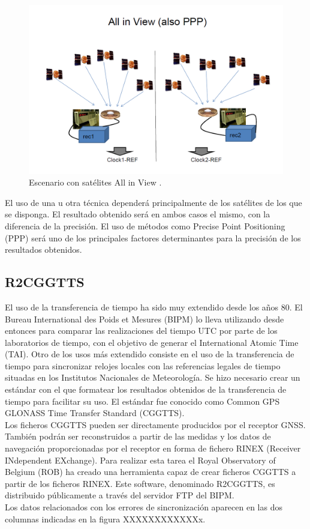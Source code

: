 \begin{figure}
	\centering
	\includegraphics[width=1\textwidth]{imagenes/allinview.PNG}
	\caption{\label{fig1}Escenario con satélites All in View \cite{timetransfer}.}
\end{figure}

El uso de una u otra técnica dependerá principalmente de los satélites de los que se disponga. El resultado obtenido será en ambos casos el mismo, con la diferencia de la precisión. El uso de métodos como Precise Point Positioning (PPP) será uno de los principales factores determinantes para la precisión de los resultados obtenidos.

\subsection{R2CGGTTS}
El uso de la transferencia de tiempo ha sido muy extendido desde los años 80. El Bureau International des Poids et Mesures (BIPM) lo lleva utilizando desde entonces para comparar las realizaciones del tiempo UTC por parte de los laboratorios de tiempo, con el objetivo de generar el International Atomic Time (TAI). Otro de los usos más extendido consiste en el uso de la transferencia de tiempo para sincronizar relojes locales con las referencias legales de tiempo situadas en los Institutos Nacionales de Meteorología. Se hizo necesario crear un estándar con el que formatear los resultados obtenidos de la transferencia de tiempo para facilitar su uso. El estándar fue conocido como Common GPS GLONASS Time Transfer Standard (CGGTTS). \\
Los ficheros CGGTTS pueden ser directamente producidos por el receptor GNSS. También podrán ser reconstruidos a partir de las medidas y los datos de navegación proporcionadas por el receptor en forma de fichero RINEX (Receiver INdependent EXchange). Para realizar esta tarea el Royal Observatory of Belgium (ROB) ha creado una herramienta capaz de crear ficheros CGGTTS a partir de los ficheros RINEX. Este software, denominado R2CGGTTS, es distribuido públicamente a través del servidor FTP del BIPM. \\
Los datos relacionados con los errores de sincronización aparecen en las dos columnas indicadas en la figura XXXXXXXXXXXXx.

